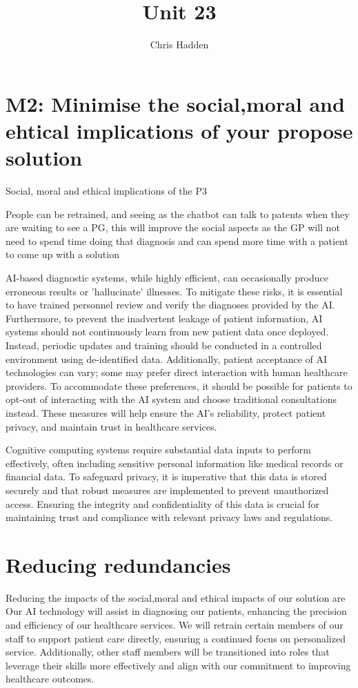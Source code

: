 \documentclass{article}
\title{Unit 23}
\author{Chris Hadden}
\date{}
\begin{document}
\maketitle

\section{M2: Minimise the social,moral and ehtical implications of your propose solution}

Social, moral and ethical implications of the P3

People can be retrained, and seeing as the chatbot can talk to patents when they are waiting to see a PG, this will improve the social aspects as the GP will not need to spend time doing that diagnosis and can spend more time with a patient to come up with a solution

AI-based diagnostic systems, while highly efficient, can occasionally produce erroneous results or 'hallucinate' illnesses. To mitigate these risks, it is essential to have trained personnel review and verify the diagnoses provided by the AI. Furthermore, to prevent the inadvertent leakage of patient information, AI systems should not continuously learn from new patient data once deployed. Instead, periodic updates and training should be conducted in a controlled environment using de-identified data. Additionally, patient acceptance of AI technologies can vary; some may prefer direct interaction with human healthcare providers. To accommodate these preferences, it should be possible for patients to opt-out of interacting with the AI system and choose traditional consultations instead. These measures will help ensure the AI's reliability, protect patient privacy, and maintain trust in healthcare services.

Cognitive computing systems require substantial data inputs to perform effectively, often including sensitive personal information like medical records or financial data. To safeguard privacy, it is imperative that this data is stored securely and that robust measures are implemented to prevent unauthorized access. Ensuring the integrity and confidentiality of this data is crucial for maintaining trust and compliance with relevant privacy laws and regulations.

\section{Reducing redundancies}
Reducing the impacts of the social,moral and ethical impacts of our solution are  
Our AI technology will assist in diagnosing our patients, enhancing the precision and efficiency of our healthcare services. We will retrain certain members of our staff to support patient care directly, ensuring a continued focus on personalized service. Additionally, other staff members will be transitioned into roles that leverage their skills more effectively and align with our commitment to improving healthcare outcomes.
\end{document}
